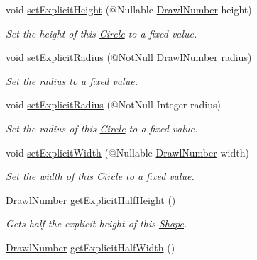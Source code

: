 \begin{DoxyCompactItemize}
void \hyperlink{classcom_1_1aarrelaakso_1_1drawl_1_1_circle_ab9d522fa3ba3c5ba770486a89d321159}{set\+Explicit\+Height} (@Nullable \hyperlink{classcom_1_1aarrelaakso_1_1drawl_1_1_drawl_number}{Drawl\+Number} height)
\begin{DoxyCompactList}\small\item\em Set the height of this \hyperlink{classcom_1_1aarrelaakso_1_1drawl_1_1_circle}{Circle} to a fixed value. \end{DoxyCompactList}\item 
void \hyperlink{classcom_1_1aarrelaakso_1_1drawl_1_1_circle_ab488257bdd425addecb822c45ed659ba}{set\+Explicit\+Radius} (@Not\+Null \hyperlink{classcom_1_1aarrelaakso_1_1drawl_1_1_drawl_number}{Drawl\+Number} radius)
\begin{DoxyCompactList}\small\item\em Set the radius to a fixed value. \end{DoxyCompactList}\item 
void \hyperlink{classcom_1_1aarrelaakso_1_1drawl_1_1_circle_af34a59acf0e1fc33777aca1b9be7b23d}{set\+Explicit\+Radius} (@Not\+Null Integer radius)
\begin{DoxyCompactList}\small\item\em Set the radius of this \hyperlink{classcom_1_1aarrelaakso_1_1drawl_1_1_circle}{Circle} to a fixed value. \end{DoxyCompactList}\item 
void \hyperlink{classcom_1_1aarrelaakso_1_1drawl_1_1_circle_a685203081a4d1f1065b714d215f2fcc2}{set\+Explicit\+Width} (@Nullable \hyperlink{classcom_1_1aarrelaakso_1_1drawl_1_1_drawl_number}{Drawl\+Number} width)
\begin{DoxyCompactList}\small\item\em Set the width of this \hyperlink{classcom_1_1aarrelaakso_1_1drawl_1_1_circle}{Circle} to a fixed value. \end{DoxyCompactList}\item 
\hyperlink{classcom_1_1aarrelaakso_1_1drawl_1_1_drawl_number}{Drawl\+Number} \hyperlink{classcom_1_1aarrelaakso_1_1drawl_1_1_shape_a7207aa8ba07ed18af81fb9d92a979cd6}{get\+Explicit\+Half\+Height} ()
\begin{DoxyCompactList}\small\item\em Gets half the explicit height of this \hyperlink{classcom_1_1aarrelaakso_1_1drawl_1_1_shape}{Shape}. \end{DoxyCompactList}\item 
\hyperlink{classcom_1_1aarrelaakso_1_1drawl_1_1_drawl_number}{Drawl\+Number} \hyperlink{classcom_1_1aarrelaakso_1_1drawl_1_1_shape_af952f32cb1706da71c9cb75916f4d665}{get\+Explicit\+Half\+Width} ()

\end{DoxyCompactItemize}
